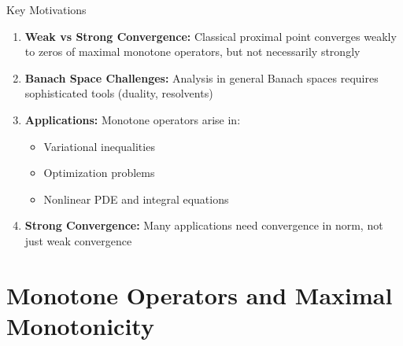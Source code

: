 \documentclass[aspectratio=169,10pt]{beamer}
\begin{document}
\begin{frame}{Key Motivations}
    \begin{enumerate}
        \item \textbf{Weak vs Strong Convergence:} Classical proximal point converges weakly
              to zeros of maximal monotone operators, but not necessarily strongly

        \item \textbf{Banach Space Challenges:} Analysis in general Banach spaces requires
              sophisticated tools (duality, resolvents)

        \item \textbf{Applications:} Monotone operators arise in:
              \begin{itemize}
                  \item Variational inequalities
                  \item Optimization problems
                  \item Nonlinear PDE and integral equations
              \end{itemize}

        \item \textbf{Strong Convergence:} Many applications need convergence in norm,
              not just weak convergence
    \end{enumerate}
\end{frame}

\section{Monotone Operators and Maximal Monotonicity}
\end{document}
